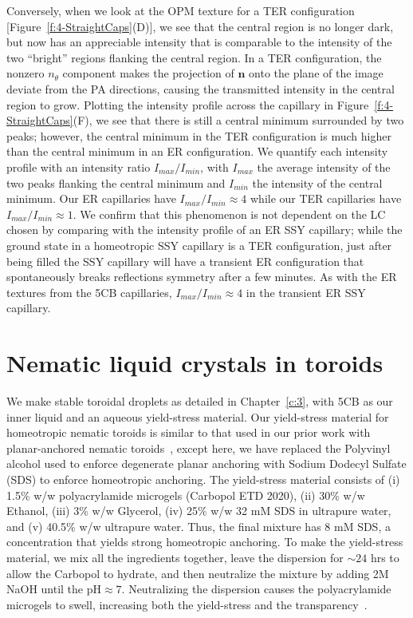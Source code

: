 Conversely, when we look at the OPM texture for a TER configuration [Figure~\ref{f:4-StraightCaps}(D)], we see that the central region is no longer dark, but now has an appreciable intensity that is comparable to the intensity of the two ``bright'' regions flanking the central region.
In a TER configuration, the nonzero $n_{\theta}$ component makes the projection of $\mathbf{n}$ onto the plane of the image deviate from the PA directions, causing the transmitted intensity in the central region to grow.
Plotting the intensity profile across the capillary in Figure~\ref{f:4-StraightCaps}(F), we see that there is still a central minimum surrounded by two peaks; however, the central minimum in the TER configuration is much higher than the central minimum in an ER configuration.
We quantify each intensity profile with an intensity ratio $I_{max}/I_{min}$, with $I_{max}$ the average intensity of the two peaks flanking the central minimum and $I_{min}$ the intensity of the central minimum.
Our ER capillaries have $I_{max}/I_{min} \approx 4$ while our TER capillaries have $I_{max}/I_{min} \approx 1$.
We confirm that this phenomenon is not dependent on the LC chosen by comparing with the intensity profile of an ER SSY capillary; while the ground state in a homeotropic SSY capillary is a TER configuration, just after being filled the SSY capillary will have a transient ER configuration that spontaneously breaks reflections symmetry after a few minutes.
As with the ER textures from the 5CB capillaries, $I_{max}/I_{min} \approx 4$ in the transient ER SSY capillary.




\section{Nematic liquid crystals in toroids}
We make stable toroidal droplets as detailed in Chapter~\ref{c:3}, with 5CB as our inner liquid and an aqueous yield-stress material.
Our yield-stress material for homeotropic nematic toroids is similar to that used in our prior work with planar-anchored nematic toroids~\cite{RN46}, except here, we have replaced the Polyvinyl alcohol used to enforce degenerate planar anchoring with Sodium Dodecyl Sulfate (SDS) to enforce homeotropic anchoring.
The yield-stress material consists of (i) 1.5\% w/w polyacrylamide microgels (Carbopol ETD 2020), (ii) 30\% w/w Ethanol, (iii) 3\% w/w Glycerol, (iv) 25\% w/w 32 mM SDS in ultrapure water, and (v) 40.5\% w/w ultrapure water.
Thus, the final mixture has 8 mM SDS, a concentration that yields strong homeotropic anchoring.
To make the yield-stress material, we mix all the ingredients together, leave the dispersion for $\sim 24$ hrs to allow the Carbopol to hydrate, and then neutralize the mixture by adding 2M NaOH until the pH$\approx 7$.
Neutralizing the dispersion causes the polyacrylamide microgels to swell, increasing both the yield-stress and the transparency~\cite{RN46,RN47}.

